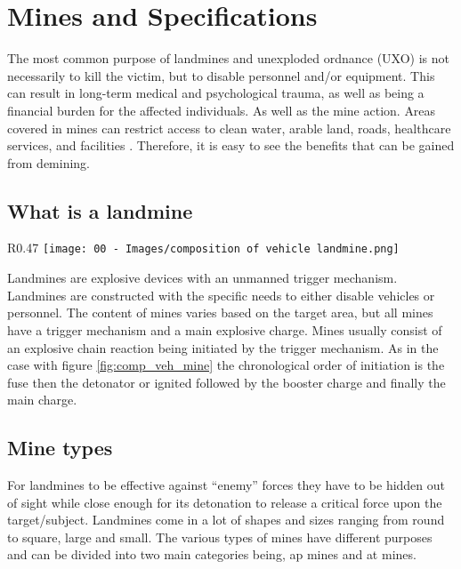 \section{Mines and Specifications}\label{mas_23}

The most common purpose of landmines and unexploded ordnance (UXO) is not necessarily to kill the victim, but to disable personnel and/or equipment. This can result in long-term medical and psychological trauma, as well as being a financial burden for the affected individuals. As well as the mine action. \cite{LandmineMonitor2019} Areas covered in mines can restrict access to clean water, arable land, roads, healthcare services, and facilities \cite{OxfordAcademic2005}. Therefore, it is easy to see the benefits that can be gained from demining. 

\subsection{What is a landmine}

\begin{wrapfigure}{R}{0.47\linewidth}
\vspace{-8mm}
\centering
\texttt{[image: 00 - Images/composition of vehicle landmine.png]}
  \caption{Composition of Vehicle Landmine \cite{NAP10071}}
  \label{fig:comp_veh_mine}
\end{wrapfigure}

Landmines are explosive devices with an unmanned trigger mechanism. Landmines are constructed with the specific needs to either disable vehicles or personnel. The content of mines varies based on the target area, but all mines have a trigger mechanism and a main explosive charge. Mines usually consist of an explosive chain reaction being initiated by the trigger mechanism. As in the case with figure \ref{fig:comp_veh_mine} the chronological order of initiation is the fuse then the detonator or ignited followed by the booster charge and finally the main charge. \cite{NAP10071}

\subsection{Mine types}\label{mine_types}
For landmines to be effective against “enemy” forces they have to be hidden out of sight while close enough for its detonation to release a critical force upon the target/subject. Landmines come in a lot of shapes and sizes ranging from round to square, large and small. The various types of mines have different purposes and can be divided into two main categories being, \gls{ap} mines and \gls{at} mines.


